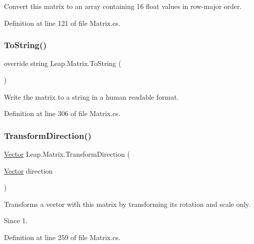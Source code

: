 Convert this matrix to an array containing 16 float values in row-\/major order. 



Definition at line 121 of file Matrix.\+cs.

\mbox{\label{struct_leap_1_1_matrix_acfd1fe19641c592fa4ae31c827a4a0f0}} 
\subsubsection{\texorpdfstring{ToString()}{ToString()}}
{\footnotesize\ttfamily override string Leap.\+Matrix.\+To\+String (\begin{DoxyParamCaption}{ }\end{DoxyParamCaption})}



Write the matrix to a string in a human readable format. 



Definition at line 306 of file Matrix.\+cs.

\mbox{\label{struct_leap_1_1_matrix_a64110864a06e02eb50977596633d39a6}} 
\subsubsection{\texorpdfstring{TransformDirection()}{TransformDirection()}}
{\footnotesize\ttfamily \mbox{\hyperlink{struct_leap_1_1_vector}{Vector}} Leap.\+Matrix.\+Transform\+Direction (\begin{DoxyParamCaption}\item[{\mbox{\hyperlink{struct_leap_1_1_vector}{Vector}}}]{direction }\end{DoxyParamCaption})}



Transforms a vector with this matrix by transforming its rotation and scale only. 

\begin{DoxySince}{Since}
1. 
\end{DoxySince}


Definition at line 259 of file Matrix.\+cs.

\mbox{\label{struct_leap_1_1_matrix_a7b8850c2aa058dd0d986325eb52ed3f9}} 
